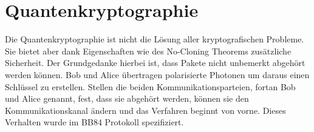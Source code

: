 \section{Quantenkryptographie}

Die Quantenkryptographie ist nicht die L\"osung aller kryptografischen Probleme.
Sie bietet aber dank Eigenschaften wie des No-Cloning Theorems zus\"atzliche Sicherheit.
Der Grundgedanke hierbei ist, dass Pakete nicht unbemerkt abgeh\"ort werden k\"onnen.
Bob und Alice \"ubertragen polarisierte Photonen um daraus einen Schl\"ussel zu erstellen.
Stellen die beiden Kommunikationsparteien, fortan Bob und Alice genannt, fest, dass sie abgeh\"ort werden, k\"onnen sie den Kommunikationskanal \"andern und das Verfahren beginnt von vorne.
Dieses Verhalten wurde im BB84 Protokoll spezifiziert.



